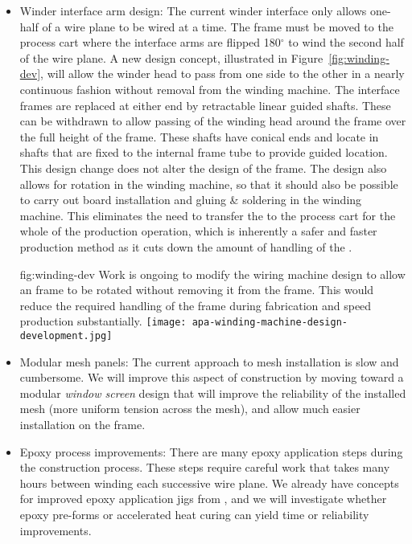 \begin{itemize}
\item Winder interface arm design: The current winder interface only allows one-half of a wire plane to be wired at a time. The  frame must be moved to the process cart where the interface arms are flipped 180$^\circ$ to wind the second half of the wire plane.  A new design concept, illustrated in Figure~\ref{fig:winding-dev}, will allow the winder head to pass from one side to the other in a nearly continuous fashion without removal from the winding machine.  The interface frames are replaced at either end by retractable linear guided shafts. These can be withdrawn to allow passing of the winding head around the frame over the full height of the frame. These shafts have conical ends and locate in shafts that are fixed to the internal frame tube to provide guided location. This design change does not alter the design of the frame. The design also allows for rotation in the winding machine, so that it should also be possible to carry out board installation and gluing \& soldering in the winding machine. This eliminates the need to transfer the  to the process cart for the whole of the production operation, which is inherently a safer and faster production method as it cuts down the amount of handling of the .

\begin{dunefigure}{fig:winding-dev}
{Work is ongoing to modify the wiring machine design to allow an  frame to be rotated without removing it from the frame.  This would reduce the required handling of the frame during fabrication and speed production substantially.}
\texttt{[image: apa-winding-machine-design-development.jpg]} 
\end{dunefigure}

\item Modular mesh panels: The current approach to mesh installation is slow and cumbersome. We will improve this aspect of construction by moving toward a modular \textit{window screen} design that will improve the reliability of the installed mesh (more uniform tension across the mesh), and allow much easier installation on the  frame.

\item Epoxy process improvements: There are many epoxy application steps during the construction process. These steps require careful work that takes many hours between winding each successive wire plane. We already have concepts for improved epoxy application jigs from , and we will investigate whether epoxy pre-forms or accelerated heat curing can yield time or reliability improvements.


\end{itemize}
